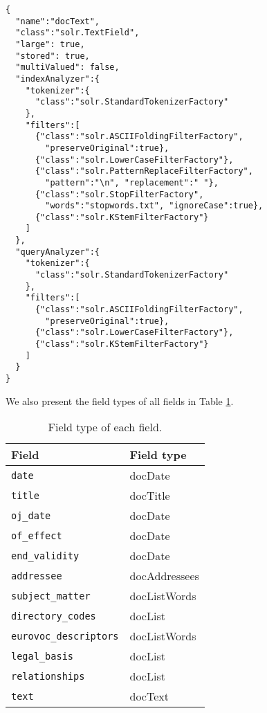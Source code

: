\documentclass[sigconf, authorversion]{acmart}
\begin{document}
\begin{lstlisting}[caption={Field type \texttt{docText}}]
{
  "name":"docText",
  "class":"solr.TextField",
  "large": true,
  "stored": true,
  "multiValued": false,
  "indexAnalyzer":{
    "tokenizer":{
      "class":"solr.StandardTokenizerFactory"
    },
    "filters":[
      {"class":"solr.ASCIIFoldingFilterFactory",
        "preserveOriginal":true},
      {"class":"solr.LowerCaseFilterFactory"},
      {"class":"solr.PatternReplaceFilterFactory",
        "pattern":"\n", "replacement":" "},
      {"class":"solr.StopFilterFactory",
        "words":"stopwords.txt", "ignoreCase":true},
      {"class":"solr.KStemFilterFactory"}
    ]
  },
  "queryAnalyzer":{
    "tokenizer":{
      "class":"solr.StandardTokenizerFactory"
    },
    "filters":[
      {"class":"solr.ASCIIFoldingFilterFactory",
        "preserveOriginal":true},
      {"class":"solr.LowerCaseFilterFactory"},
      {"class":"solr.KStemFilterFactory"}
    ]
  }
}
\end{lstlisting}

We also present the field types of all fields in Table \ref{tab:field-types}.

\begin{table}[ht]
    \centering
    \caption{Field type of each field.} \label{tab:field-types}
    \begin{tabular}{@{}l|l@{}}
        \textbf{Field} & \textbf{Field type} \\ \hline
        \texttt{date}                   & docDate        \\
        \texttt{title}                  & docTitle       \\
        \texttt{oj\_date}               & docDate        \\
        \texttt{of\_effect}             & docDate        \\
        \texttt{end\_validity}          & docDate        \\
        \texttt{addressee}              & docAddressees  \\
        \texttt{subject\_matter}        & docListWords   \\
        \texttt{directory\_codes}       & docList        \\
        \texttt{eurovoc\_descriptors}   & docListWords   \\
        \texttt{legal\_basis}           & docList        \\
        \texttt{relationships}          & docList        \\
        \texttt{text}                   & docText        \\
    \end{tabular}
\end{table}
\end{document}
